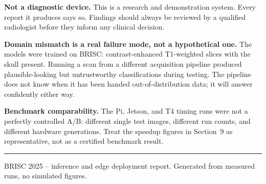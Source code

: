 \documentclass[11pt]{article}
\begin{document}
\textbf{Not a diagnostic device.} This is a research and demonstration system. Every
report it produces says so. Findings should always be reviewed by a qualified
radiologist before they inform any clinical decision.

\textbf{Domain mismatch is a real failure mode, not a hypothetical one.} The models were
trained on BRISC: contrast-enhanced T1-weighted slices with the skull present. Running a
scan from a different acquisition pipeline produced plausible-looking but untrustworthy
classifications during testing. The pipeline does not know when it has been handed
out-of-distribution data; it will answer confidently either way.

\textbf{Benchmark comparability.} The Pi, Jetson, and T4 timing runs were not a
perfectly controlled A/B: different single test images, different run counts, and
different hardware generations. Treat the speedup figures in Section~9 as
representative, not as a certified benchmark result.

\vspace{1em}
\noindent\rule{\linewidth}{0.4pt}
\small\color{midgray} BRISC 2025 -- inference and edge deployment report. Generated from measured runs, no simulated figures.
\end{document}
